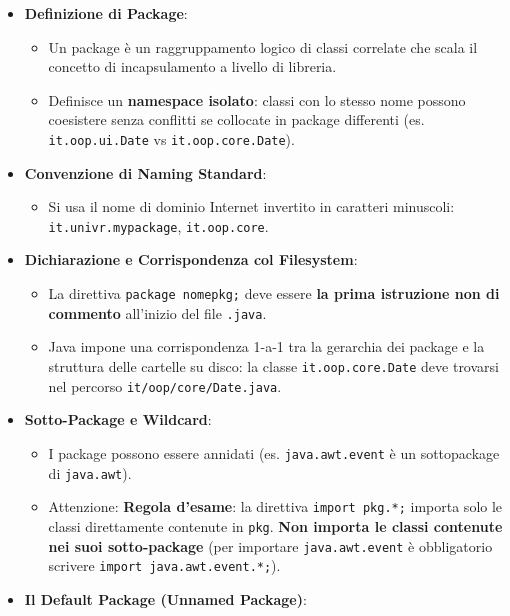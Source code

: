 \documentclass[11pt,a4paper]{article}
\newcommand{\passthrough}[1]{#1}
\providecommand{\tightlist}{\setlength{\itemsep}{0pt}\setlength{\parskip}{0pt}}
\begin{document}
\begin{itemize}
\tightlist
\item
  \textbf{Definizione di Package}:

  \begin{itemize}
  \tightlist
  \item
    Un package è un raggruppamento logico di classi correlate che scala
    il concetto di incapsulamento a livello di libreria.
  \item
    Definisce un \textbf{namespace isolato}: classi con lo stesso nome
    possono coesistere senza conflitti se collocate in package
    differenti (es. \passthrough{\lstinline!it.oop.ui.Date!} vs
    \passthrough{\lstinline!it.oop.core.Date!}).
  \end{itemize}
\item
  \textbf{Convenzione di Naming Standard}:

  \begin{itemize}
  \tightlist
  \item
    Si usa il nome di dominio Internet invertito in caratteri minuscoli:
    \passthrough{\lstinline!it.univr.mypackage!},
    \passthrough{\lstinline!it.oop.core!}.
  \end{itemize}
\item
  \textbf{Dichiarazione e Corrispondenza col Filesystem}:

  \begin{itemize}
  \tightlist
  \item
    La direttiva \passthrough{\lstinline!package nomepkg;!} deve essere
    \textbf{la prima istruzione non di commento} all'inizio del file
    \passthrough{\lstinline!.java!}.
  \item
    Java impone una corrispondenza 1-a-1 tra la gerarchia dei package e
    la struttura delle cartelle su disco: la classe
    \passthrough{\lstinline!it.oop.core.Date!} deve trovarsi nel
    percorso \passthrough{\lstinline!it/oop/core/Date.java!}.
  \end{itemize}
\item
  \textbf{Sotto-Package e Wildcard}:

  \begin{itemize}
  \tightlist
  \item
    I package possono essere annidati (es.
    \passthrough{\lstinline!java.awt.event!} è un sottopackage di
    \passthrough{\lstinline!java.awt!}).
  \item
    Attenzione: \textbf{Regola d'esame}: la direttiva
    \passthrough{\lstinline!import pkg.*;!} importa solo le classi
    direttamente contenute in \passthrough{\lstinline!pkg!}. \textbf{Non
    importa le classi contenute nei suoi sotto-package} (per importare
    \passthrough{\lstinline!java.awt.event!} è obbligatorio scrivere
    \passthrough{\lstinline!import java.awt.event.*;!}).
  \end{itemize}
\item
  \textbf{Il Default Package (Unnamed Package)}:


\end{itemize}
\end{document}

